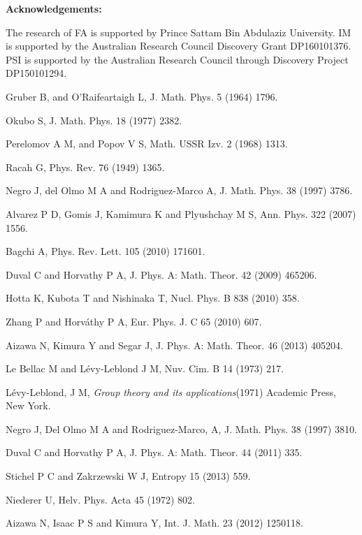 \documentclass[12pt]{article}
\begin{document}
{\bf Acknowledgements:}

The research of FA is supported by Prince Sattam Bin Abdulaziz University. IM is supported
by the Australian Research Council Discovery Grant DP160101376. PSI is supported by the Australian Research Council
through Discovery Project DP150101294.


\begin{thebibliography}{}

Gruber B, and O'Raifeartaigh L, J. Math. Phys. 5 (1964) 1796.
	
Okubo S, J. Math. Phys. 18 (1977) 2382.
	
Perelomov A M, and Popov V S, Math. USSR Izv. 2 (1968) 1313.

Racah G, Phys. Rev. 76 (1949) 1365.

Negro J, del Olmo M A and Rodriguez-Marco A, J.  Math.  Phys. 38 (1997) 3786.

Alvarez P D, Gomis J, Kamimura K and Plyushchay M S, Ann. Phys. 322 (2007) 1556.

Bagchi A, Phys. Rev. Lett. 105 (2010) 171601. 

Duval C and Horvathy P A, J.  Phys. A: Math.  Theor. 42 (2009) 465206.

Hotta K, Kubota T and Nishinaka T, Nucl. Phys. B 838 (2010) 358. 
 
Zhang P and Horv\'{a}thy P A, Eur. Phys. J. C 65 (2010) 607.

Aizawa N, Kimura Y and Segar J, J. Phys. A: Math. Theor. 46 (2013) 405204.

Le Bellac M and L\'{e}vy-Leblond J M, Nuv. Cim. B 14 (1973) 217.

L\'{e}vy-Leblond, J M, \textit{Group theory and its applications}(1971) Academic Press, New York.

Negro J, Del Olmo M A  and Rodriguez-Marco, A, J. Math. Phys. 38 (1997) 3810.

Duval C and Horvathy P A, J. Phys. A: Math.  Theor. 44 (2011) 335.

Stichel P C and Zakrzewski W J, Entropy 15 (2013) 559.
 
Niederer U, Helv. Phys. Acta 45 (1972) 802.

Aizawa N, Isaac P S and Kimura Y, Int. J. Math. 23 (2012) 1250118.


\end{thebibliography}
\end{document}
